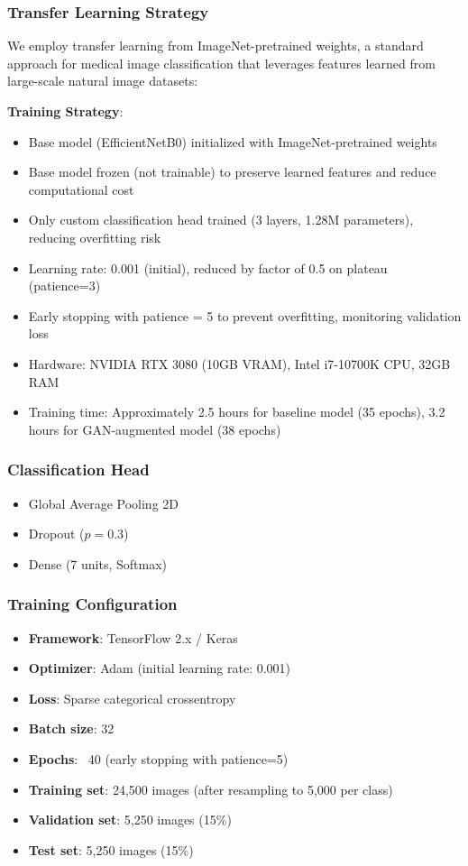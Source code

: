 \documentclass[10pt, twocolumn, letterpaper]{article}
\begin{document}
\subsubsection{Transfer Learning Strategy}
We employ transfer learning from ImageNet-pretrained weights, a standard approach for medical image classification that leverages features learned from large-scale natural image datasets:

\textbf{Training Strategy}:
\begin{itemize}[leftmargin=*, itemsep=2pt]
    \item Base model (EfficientNetB0) initialized with ImageNet-pretrained weights
    \item Base model frozen (not trainable) to preserve learned features and reduce computational cost
    \item Only custom classification head trained (3 layers, 1.28M parameters), reducing overfitting risk
    \item Learning rate: 0.001 (initial), reduced by factor of 0.5 on plateau (patience=3)
    \item Early stopping with patience = 5 to prevent overfitting, monitoring validation loss
    \item Hardware: NVIDIA RTX 3080 (10GB VRAM), Intel i7-10700K CPU, 32GB RAM
    \item Training time: Approximately 2.5 hours for baseline model (35 epochs), 3.2 hours for GAN-augmented model (38 epochs)
\end{itemize}

\subsubsection{Classification Head}
\begin{itemize}[leftmargin=*, itemsep=2pt]
    \item Global Average Pooling 2D
    \item Dropout ($p = 0.3$)
    \item Dense (7 units, Softmax)
\end{itemize}

\subsubsection{Training Configuration}
\begin{itemize}[leftmargin=*, itemsep=2pt]
    \item \textbf{Framework}: TensorFlow 2.x / Keras
    \item \textbf{Optimizer}: Adam (initial learning rate: 0.001)
    \item \textbf{Loss}: Sparse categorical crossentropy
    \item \textbf{Batch size}: 32
    \item \textbf{Epochs}: ~40 (early stopping with patience=5)
    \item \textbf{Training set}: 24,500 images (after resampling to 5,000 per class)
    \item \textbf{Validation set}: 5,250 images (15\%)
    \item \textbf{Test set}: 5,250 images (15\%)
\end{itemize}
\end{document}
